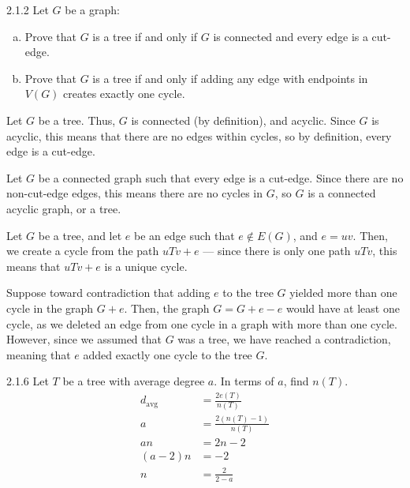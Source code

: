 \documentclass[10pt]{extarticle}
\title{}
\author{Avinash Iyer}
\date{}
\begin{document}
  \begin{problem}{2.1.2}
    Let $G$ be a graph:
    \begin{enumerate}[(a)]
      \item Prove that $G$ is a tree if and only if $G$ is connected and every edge is a cut-edge.
      \item Prove that $G$ is a tree if and only if adding any edge with endpoints in $V(G)$ creates exactly one cycle.
    \end{enumerate}
    \tcblower
    \begin{tcolorbox}[colback = white, title = (a), breakable]
      \begin{description}[font=\normalfont\scshape]
        \item[($\Rightarrow$)] Let $G$ be a tree. Thus, $G$ is connected (by definition), and acyclic. Since $G$ is acyclic, this means that there are no edges within cycles, so by definition, every edge is a cut-edge.
        \item[($\Leftarrow$)] Let $G$ be a connected graph such that every edge is a cut-edge. Since there are no non-cut-edge edges, this means there are no cycles in $G$, so $G$ is a connected acyclic graph, or a tree.
      \end{description}
    \end{tcolorbox}
    \begin{tcolorbox}[colback = white, title = (b), breakable]
      \begin{description}[font=\normalfont\scshape]
        \item[($\Rightarrow$)] Let $G$ be a tree, and let $e$ be an edge such that $e\notin E(G)$, and $e = uv$. Then, we create a cycle from the path $uTv + e$ --- since there is only one path $uTv$, this means that $uTv+e$ is a unique cycle.
        \item[($\Leftarrow$)] Suppose toward contradiction that adding $e$ to the tree $G$ yielded more than one cycle in the graph $G+e$. Then, the graph $G = G + e - e$ would have at least one cycle, as we deleted an edge from one cycle in a graph with more than one cycle. However, since we assumed that $G$ was a tree, we have reached a contradiction, meaning that $e$ added exactly one cycle to the tree $G$.
      \end{description}
    \end{tcolorbox}
  \end{problem}
  \begin{problem}{2.1.6}
    Let $T$ be a tree with average degree $a$. In terms of $a$, find $n(T)$.
    \tcblower
    \begin{align*}
      d_{\textrm{avg}} &= \frac{2e(T)}{n(T)}\\
                    a  &= \frac{2(n(T) - 1)}{n(T)} \\
                    an &= 2n-2 \\
              (a-2)n &= -2 \\
              n &= \boxed{\frac{2}{2-a}} 
    \end{align*}
  \end{problem}
\end{document}

